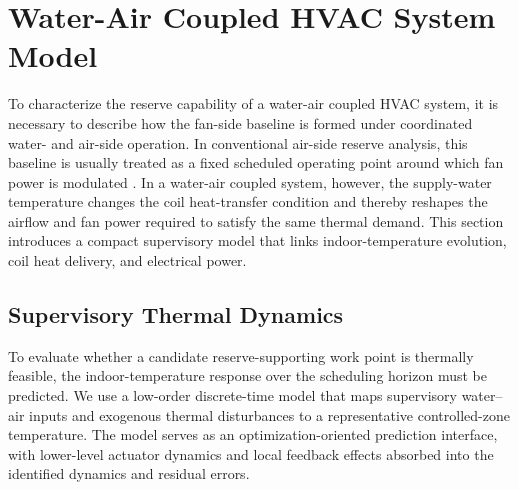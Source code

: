 \documentclass[journal]{IEEEtran}
\theoremstyle{remark}
\begin{document}
	\section{Water-Air Coupled HVAC System Model}
	\label{sec:system_modeling}
	To characterize the reserve capability of a water-air coupled HVAC system, it is necessary to describe how the fan-side baseline is formed under coordinated water- and air-side operation. In conventional air-side reserve analysis, this baseline is usually treated as a fixed scheduled operating point around which fan power is modulated \cite{vrettos2015scheduling,liu2017evaluation,aslam2023optimal}. In a water-air coupled system, however, the supply-water temperature changes the coil heat-transfer condition and thereby reshapes the airflow and fan power required to satisfy the same thermal demand. This section introduces a compact supervisory model that links indoor-temperature evolution, coil heat delivery, and electrical power.
	\subsection{Supervisory Thermal Dynamics}
	
	To evaluate whether a candidate reserve-supporting work point is thermally feasible, the indoor-temperature response over the scheduling horizon must be predicted. We use a low-order discrete-time model that maps supervisory water--air inputs and exogenous thermal disturbances to a representative controlled-zone temperature. The model serves as an optimization-oriented prediction interface, with lower-level actuator dynamics and local feedback effects absorbed into the identified dynamics and residual errors.
	
\end{document}
